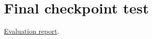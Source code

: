 \section{Final checkpoint
test}\label{record-docs-image-final-checkpoint-test-results-md-final-checkpoint-test}

\href{../results/research_workflow/image_dda/20261025T213338529186Z/report.md}{Evaluation
report}.
